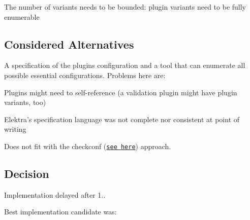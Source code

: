 \begin{DoxyItemize}
\item The number of variants needs to be bounded\+: plugin variants need to be fully enumerable
\end{DoxyItemize}

\subsection*{Considered Alternatives}

A specification of the plugin\textquotesingle{}s configuration and a tool that can enumerate all possible essential configurations. Problems here are\+:


\begin{DoxyItemize}
\item Plugins might need to self-\/reference (a validation plugin might have plugin variants, too)
\item Elektra’s specification language was not complete nor consistent at point of writing
\item Does not fit with the {\ttfamily checkconf} (\href{https://git.libelektra.org/issues/559}{\tt see here}) approach.
\end{DoxyItemize}

\subsection*{Decision}

Implementation delayed after 1..

Best implementation candidate was\+:


